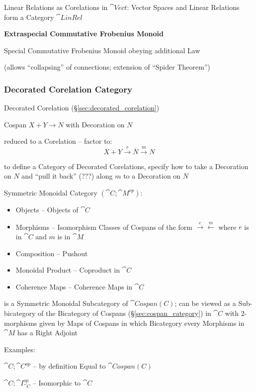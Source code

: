 Linear Relations as Corelations in $\cat{Vect}$:
Vector Spaces and Linear Relations form a Category $\cat{LinRel}$


\textbf{Extraspecial Commutative Frobenius Monoid}

Special Commutative Frobenius Monoid obeying additional Law

(allows ``collapsing'' of connections; extension of ``Spider
Theorem'')



\subsubsection{Decorated Corelation Category}
\label{sec:decorated_corelation_category}

Decorated Corelation (\S\ref{sec:decorated_corelation})

Cospan $X + Y \rightarrow N$ with Decoration on $N$

reduced to a Corelation -- factor to:
\[
  X + Y \xrightarrow{e} \overline{N} \xrightarrow{m} N
\]

to define a Category of Decorated Corelations, specify how to take a
Decoration on $N$ and ``pull it back'' (???) along $m$ to a Decoration
on $\overline{N}$

Symmetric Monoidal Category $(\cat{C}; \cat{M}^{op})$:
\begin{itemize}
  \item Objects -- Objects of $\cat{C}$
  \item Morphisms -- Isomorphism Classes of Cospans of the form
    $\xrightarrow{e}\xleftarrow{m}$ where $e$ is in $\cat{C}$ and $m$
    is in $\cat{M}$
  \item Composition -- Pushout
  \item Monoidal Product -- Coproduct in $\cat{C}$
  \item Coherence Maps -- Coherence Maps in $\cat{C}$
\end{itemize}
is a Symmetric Monoidal Subcategory of $\cat{Cospan(C)}$; can be
viewed as a Sub-bicategory of the Bicategory of Cospans
(\S\ref{sec:cospan_category}) in $\cat{C}$ with $2$-morphisms given by
Maps of Cospans in which Bicategory every Morphisms in $\cat{M}$ has a
Right Adjoint


Examples:

$\cat{C};\cat{C}^{op}$ -- by definition Equal to $\cat{Cospan(C)}$

$\cat{C};\cat{I}_{\cat{C}}^{op}$ -- Isomorphic to $\cat{C}$

